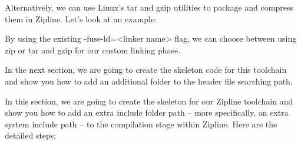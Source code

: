 Alternatively, we can use Linux's tar and gzip utilities to package and compress them in Zipline. Let's look at an example:


By using the existing -fuse-ld=<linker name> flag, we can choose between using zip or tar and gzip for our custom linking phase.

In the next section, we are going to create the skeleton code for this toolchain and show you how to add an additional folder to the header file searching path.


In this section, we are going to create the skeleton for our Zipline toolchain and show you how to add an extra include folder path – more specifically, an extra system include path – to the compilation stage within Zipline. Here are the detailed steps:

